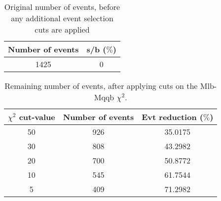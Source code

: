 \documentclass{article}
\begin{document}
 

 \begin{abstract} 
 
   The tables in this document represent the influence of the additional event selection cuts that were applied in order to reduce the number of selected events for CPU reasons. \\ 
   The considered cuts are rather basic and are merely developed to reduce the number of so-called wrong events \\ 
   \begin{itemize} 
     \item Cut on Mlb-Mqqb $\chi^{2}$ distribution 
     \item Cut on top and W-mass window 
   \end{itemize} 
 
   \textbf{Created on :} \today 
 \end{abstract} 
 
 \begin{table}[h!t] 
  \caption{Original number of events, before any additional event selection cuts are applied} 
  \centering 
   \begin{tabular}{c|c} 
     Number of events    & s/b ($\%$)     \\ 
     \hline
     1425  & 0 
 
   \end{tabular} 
 \end{table} 
 
 \begin{table}[h!t] 
  \caption{Remaining number of events, after applying cuts on the Mlb-Mqqb $\chi^{2}$.} 
  \centering 
   \begin{tabular}{c|c|c|} 
     $\chi^{2}$ cut-value    & Number of events  & Evt reduction ($\%$)    \\ 
     \hline
     50  &   926  &  35.0175 \\ 
     30  &   808  &  43.2982 \\ 
     20  &   700  &  50.8772 \\ 
     10  &   545  &  61.7544 \\ 
     5  &   409  &  71.2982 \\ 
   \end{tabular} 
 \end{table} 
 
\end{document}

